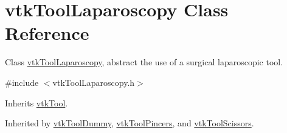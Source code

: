 \hypertarget{classvtkToolLaparoscopy}{
\section{vtkToolLaparoscopy Class Reference}
\label{classvtkToolLaparoscopy}
}


Class \hyperlink{classvtkToolLaparoscopy}{vtkToolLaparoscopy}, abstract the use of a surgical laparoscopic tool.  




{\ttfamily \#include $<$vtkToolLaparoscopy.h$>$}



Inherits \hyperlink{classvtkTool}{vtkTool}.



Inherited by \hyperlink{classvtkToolDummy}{vtkToolDummy}, \hyperlink{classvtkToolPincers}{vtkToolPincers}, and \hyperlink{classvtkToolScissors}{vtkToolScissors}.



